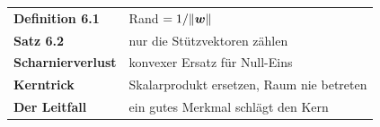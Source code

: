 \begin{merksatz}
\begin{center}
\renewcommand{\arraystretch}{1.5}
\begin{tabular}{@{}P{3.0cm}P{5.6cm}@{}}
\toprule
\textbf{Definition 6.1} & Rand $= 1/\|\boldsymbol{w}\|$\\
\textbf{Satz 6.2} & nur die Stützvektoren zählen\\
\textbf{Scharnierverlust} & konvexer Ersatz für Null-Eins\\
\textbf{Kerntrick} & Skalarprodukt ersetzen, Raum nie betreten\\
\textbf{Der Leitfall} & ein gutes Merkmal schlägt den Kern\\
\bottomrule
\end{tabular}
\end{center}

\begin{center}
\begin{minipage}{0.88\textwidth}
\end{minipage}
\end{center}
\end{merksatz}
